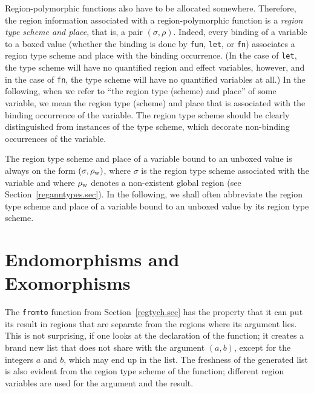 \documentclass[12pt]{book}
\newcommand{\rhoword}{\rho_{\rm w}}
\begin{document}
Region-polymorphic functions also have to be allocated somewhere.
Therefore, the region information associated with a region-polymorphic
function is a {\em region type scheme and place}, that is, a pair
$(\sigma,\rho)$.  Indeed, every binding of a variable to a boxed value
(whether the binding is done by {\tt fun}, {\tt let}, or {\tt fn})
associates a region type scheme and place with the binding occurrence.
(In the case of {\tt let}, the type scheme will have no quantified
region and effect variables, however, and in the case of {\tt fn}, the
type scheme will have no quantified variables at all.) 
In the following, when we refer to ``the region type (scheme) and
place'' of some variable, we mean the region type (scheme) and place
that is associated with the binding occurrence of the variable. The
region type scheme should be clearly distinguished from instances of
the type scheme, which decorate non-binding occurrences of the
variable.

The region type scheme and place of a variable bound to an unboxed
value is always on the form $(\sigma,\rhoword)$, where $\sigma$ is the
region type scheme associated with the variable and where $\rhoword$ denotes
a non-existent global region (see Section~\ref{reganntypes.sec}). In
the following, we shall often abbreviate the region type scheme and
place of a variable bound to an unboxed value by its region type
scheme.

\section{Endomorphisms and Exomorphisms}
The {\tt fromto} function from Section~\ref{regtych.sec} has the property that
it can put its result in regions that are separate from the regions where its
argument lies. This is not surprising, if one looks at the declaration of the
function; it creates a brand new list that does not share with the argument
$(a,b)$, except for the integers $a$ and $b$, which may end up in the list.
The freshness of the generated list is also evident from the region type scheme
of the function; different region variables are used for the argument and the result.
\end{document}
